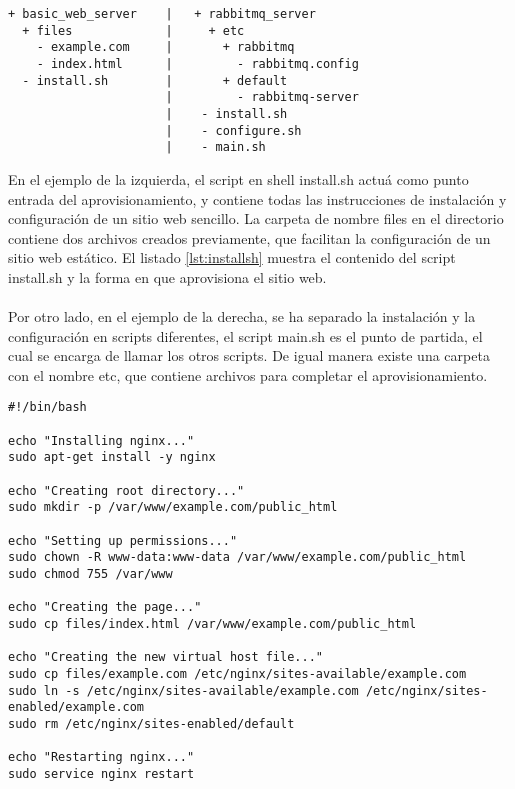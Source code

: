 \vspace{5mm}

\begin{lstlisting}[style=json, caption=Escenarios de estructura de un constructor]
+ basic_web_server    |   + rabbitmq_server
  + files             |     + etc
    - example.com     |       + rabbitmq
    - index.html      |         - rabbitmq.config
  - install.sh        |       + default
                      |         - rabbitmq-server
                      |    - install.sh
                      |    - configure.sh
                      |    - main.sh
\end{lstlisting}  

\vspace{5mm}

En el ejemplo de la izquierda, el script en shell install.sh actuá como punto entrada del aprovisionamiento, y contiene todas las instrucciones de instalación y configuración de un sitio web sencillo. La carpeta de nombre files en el directorio contiene dos archivos creados previamente, que facilitan la configuración de un sitio web estático. El listado \ref{lst:installsh} muestra el contenido del script install.sh y la forma en que aprovisiona el sitio web.\\
\\
Por otro lado, en el ejemplo de la derecha, se ha separado la instalación y la configuración en scripts diferentes, el script main.sh es el punto de partida, el cual se encarga de llamar los otros scripts. De igual manera existe una carpeta con el nombre etc, que contiene archivos para completar el aprovisionamiento.
  
\vspace{5mm}

\begin{lstlisting}[style=json, caption=Ejemplo de un script shell, label={lst:installsh}]
#!/bin/bash

echo "Installing nginx..."
sudo apt-get install -y nginx

echo "Creating root directory..."
sudo mkdir -p /var/www/example.com/public_html

echo "Setting up permissions..."
sudo chown -R www-data:www-data /var/www/example.com/public_html
sudo chmod 755 /var/www

echo "Creating the page..."
sudo cp files/index.html /var/www/example.com/public_html

echo "Creating the new virtual host file..."
sudo cp files/example.com /etc/nginx/sites-available/example.com
sudo ln -s /etc/nginx/sites-available/example.com /etc/nginx/sites-enabled/example.com
sudo rm /etc/nginx/sites-enabled/default

echo "Restarting nginx..."
sudo service nginx restart
\end{lstlisting}

